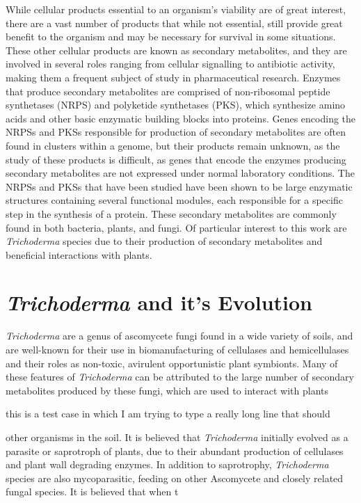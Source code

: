 While cellular products essential to an organism's viability are
of great interest, there are a vast number of products that while not
essential, still provide great benefit to the
organism and may be necessary for survival in some situations\cite
{Craney2013}\cite{Mukherjee2012}. These other cellular products are known
 as secondary metabolites, and they are involved in several roles ranging 
 from cellular signalling to antibiotic activity, making them a frequent 
 subject of study in pharmaceutical research. Enzymes that produce 
 secondary metabolites are comprised of non-ribosomal peptide synthetases 
 (NRPS) and polyketide synthetases (PKS), which synthesize amino acids and 
 other basic enzymatic building blocks\cite{Komaki2020} into proteins. 
 Genes encoding the NRPSs and PKSs responsible for production of secondary 
 metabolites are often found in clusters within a genome, but their 
 products remain unknown\cite{Mukherjee2012}, as the study of these 
 products is difficult, as genes that encode the enzymes producing 
 secondary metabolites are not expressed under normal laboratory 
 conditions\cite{Mukherjee2012}. The NRPSs and PKSs that have been studied
 have been shown to be large enzymatic structures containing several 
 functional modules, each responsible for a specific step in the synthesis 
 of a protein\cite{Mukherjee2012}. These secondary metabolites are 
 commonly found in both bacteria, plants, and fungi. Of particular 
 interest to this work are \textit{Trichoderma} species due to their  
 production of secondary metabolites and beneficial interactions with 
 plants.

\section{\textit{Trichoderma} and it's Evolution}

\textit{Trichoderma} are a genus of ascomycete fungi found in a wide
variety of soils, and are well-known for their use in biomanufacturing
of cellulases and hemicellulases and their roles as non-toxic,
avirulent opportunistic plant symbionts\cite{Woo2023}\cite{Kubicek2019}. 
Many of these features of \textit{Trichoderma}
can be attributed to the large number of secondary metabolites
produced by these fungi, which are used to interact with plants

this is a test case in which I am trying to type a really long line that should 


other organisms in the soil\cite{Mukherjee2012}.
It is believed that \textit{Trichoderma} initially evolved as a parasite 
or saprotroph of plants, due to their abundant production of cellulases 
and plant wall degrading enzymes\cite{Kubicek2019}. 
In addition to saprotrophy, \textit{Trichoderma} species are also 
mycoparasitic, feeding on other Ascomycete and closely related fungal
species\cite{Druzhinina2018}.  It is believed that when t 

